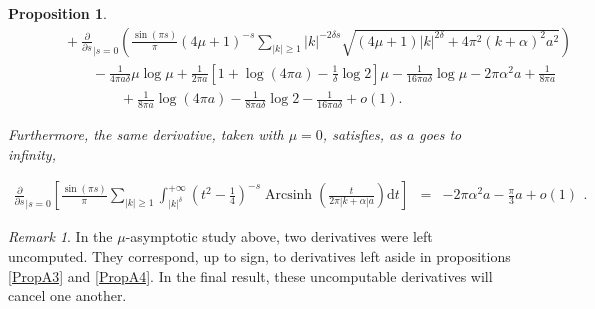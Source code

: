 \documentclass{jams-l}
\newtheorem{proposition}[theorem]{Proposition}
\theoremstyle{definition}
\theoremstyle{remark}
\newtheorem{remark}[theorem]{Remark}
\numberwithin{equation}{section}
\DeclareMathOperator{\arcsinh}{Arcsinh}
\begin{document}
\begin{proposition}
\[\begin{array}{lll}
                            && \qquad \scriptstyle + \frac{\partial}{\partial s}_{\left \vert s = 0 \right.} \left( \frac{\sin \left( \pi s \right)}{\pi} \left( 4 \mu + 1 \right)^{-s} \sum\limits_{\left \vert k \right \vert \geqslant 1} \left \vert k \right \vert^{-2 \delta s} \sqrt{\left( 4 \mu + 1 \right) \left \vert k \right \vert^{2 \delta} + 4 \pi^2 \left( k + \alpha \right)^2 a^2} \right) \\[1em]
                            
                            && \qquad \qquad \scriptstyle - \frac{1}{4 \pi a \delta} \mu \log \mu + \frac{1}{2 \pi a} \left[ 1 + \log \left( 4 \pi a \right) - \frac{1}{\delta} \log 2 \right] \mu - \frac{1}{16 \pi a \delta} \log \mu - 2 \pi \alpha^2 a + \frac{1}{8 \pi a} \\[1em]
                            
                            && \qquad \qquad \qquad \scriptstyle + \frac{1}{8 \pi a} \log \left( 4 \pi a \right) - \frac{1}{8 \pi a \delta} \log 2 - \frac{1}{16 \pi a \delta} + o \left( 1 \right).
                        \end{array} \]
                    
                    \noindent Furthermore, the same derivative, taken with $\mu = 0$, satisfies, as $a$ goes to infinity,
                    
                    \[ \begin{array}{lll}
                            \scriptstyle \frac{\partial}{\partial s}_{\left \vert s = 0 \right.} \left[ \frac{\sin \left( \pi s \right)}{\pi} \sum\limits_{\left \vert k \right \vert \geqslant 1} \int_{\left \vert k \right \vert^{\delta}}^{+ \infty} \left( t^2 - \frac{1}{4} \right)^{-s} \arcsinh \left( \frac{t}{2 \pi \left \vert k + \alpha \right \vert a} \right) \mathrm{d}t \right] & \scriptstyle = & \scriptstyle - 2 \pi \alpha^2 a - \frac{\pi}{3} a + o \left( 1 \right)
                        \end{array} . \]
                
                \end{proposition}
                
                \begin{remark}
                
                    In the $\mu$-asymptotic study above, two derivatives were left uncomputed. They correspond, up to sign, to derivatives left aside in propositions \ref{PropA3} and \ref{PropA4}. In the final result, these uncomputable derivatives will cancel one another.
                
                \end{remark}
                
\end{document}
